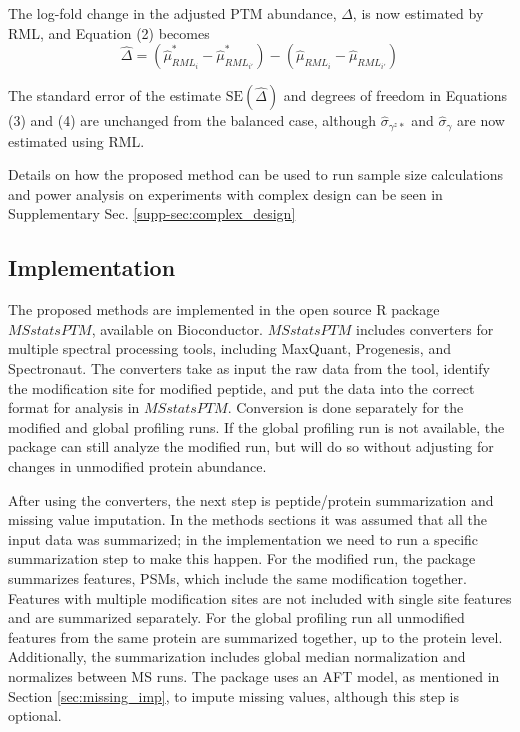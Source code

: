 \documentclass[mcp]{article}
\numberwithin{figure}{section} %
\numberwithin{table}{section}
\begin{document}
The log-fold change in the adjusted PTM abundance, $\Delta$, is now estimated by RML, and Equation (2) becomes 
\[
\hat{\Delta} = (\hat{\mu}_{RML_i}^{\ast} - \hat{\mu}_{RML_{i'}}^{\ast}) - (\hat{\mu}_{RML_i} - \hat{\mu}_{RML_{i'}})
\]

The standard error of the estimate $\mathrm{SE}(\hat{\Delta})$ and degrees of freedom in Equations (3) and (4) are unchanged from the balanced case, although $\hat{\sigma}_{\gamma^z\ast}$ and $\hat{\sigma}_{\gamma}$ are now estimated using RML.

Details on how the proposed method can be used to run sample size calculations and power analysis on experiments with complex design can be seen in Supplementary Sec. \ref{supp-sec:complex_design}

\subsection*{Implementation}

The proposed methods are implemented in the open source R package $MSstatsPTM$, available on Bioconductor. $MSstatsPTM$ includes converters for multiple spectral processing tools, including MaxQuant, Progenesis, and Spectronaut. The converters take as input the raw data from the tool, identify the modification site for modified peptide, and put the data into the correct format for analysis in $MSstatsPTM$. Conversion is done separately for the modified and global profiling runs. If the global profiling run is not available, the package can still analyze the modified run, but will do so without adjusting for changes in unmodified protein abundance.

After using the converters, the next step is peptide/protein summarization and missing value imputation. In the methods sections it was assumed that all the input data was summarized; in the implementation we need to run a specific summarization step to make this happen. For the modified run, the package summarizes features, PSMs, which include the same modification together. Features with multiple modification sites are not included with single site features and are summarized separately. For the global profiling run all unmodified features from the same protein are summarized together, up to the protein level. Additionally, the summarization includes global median normalization and normalizes between MS runs. The package uses an AFT model, as mentioned in Section \ref{sec:missing_imp}, to impute missing values, although this step is optional.
\end{document}
